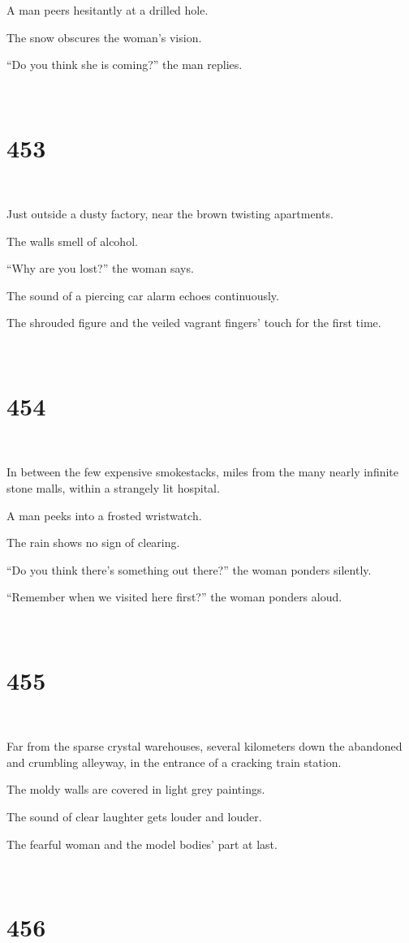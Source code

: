 \documentclass{report}
\begin{document}
A man peers hesitantly at a drilled hole.

The snow obscures the woman's vision.

``Do you think she is coming?'' the man replies.

~
\chapter*{453}
~

Just outside a dusty factory, near the brown twisting apartments.

The walls smell of alcohol.

``Why are you lost?'' the woman says.

The sound of a piercing car alarm echoes continuously.

The shrouded figure and the veiled vagrant fingers' touch for the first time.

~
\chapter*{454}
~

In between the few expensive smokestacks, miles from the many nearly infinite stone malls, within a strangely lit hospital.

A man peeks into a frosted wristwatch.

The rain shows no sign of clearing.

``Do you think there's something out there?'' the woman ponders silently.

``Remember when we visited here first?'' the woman ponders aloud.

~
\chapter*{455}
~

Far from the sparse crystal warehouses, several kilometers down the abandoned and crumbling alleyway, in the entrance of a cracking train station.

The moldy walls are covered in light grey paintings.

The sound of clear laughter gets louder and louder.

The fearful woman and the model bodies' part at last.

~
\chapter*{456}
~
\end{document}
